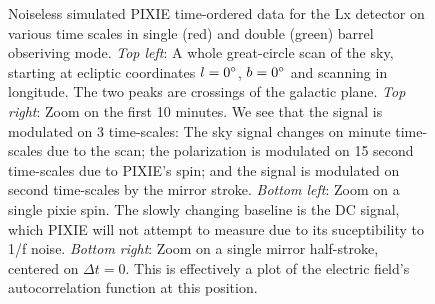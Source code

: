 \documentclass{article}
\begin{document}
\begin{figure}
\begin{tabular}{cc}
	\end{tabular}
	\caption{Noiseless simulated PIXIE time-ordered data for the Lx
	detector on various time scales in single (red) and double (green)
	barrel obseriving mode. \emph{Top left}: A whole great-circle
	scan of the sky, starting at ecliptic coordinates $l=0\degree$,
	$b=0\degree$ and scanning in longitude. The two peaks are crossings
	of the galactic plane. \emph{Top right}: Zoom on the first 10 minutes.
	We see that the signal is modulated on 3 time-scales: The sky signal
	changes on minute time-scales due to the scan; the polarization is
	modulated on 15 second time-scales due to PIXIE's spin; and the
	signal is modulated on second time-scales by the mirror stroke.
	\emph{Bottom left}: Zoom on a single pixie spin. The slowly
	changing baseline is the DC signal, which PIXIE will not attempt
	to measure due to its suceptibility to 1/f noise. \emph{Bottom
	right}: Zoom on a single mirror half-stroke, centered on
	$\Delta t=0$. This is effectively a plot of the electric field's
	autocorrelation function at this position.}
	\label{fig:tod}
\end{figure}
\end{document}
